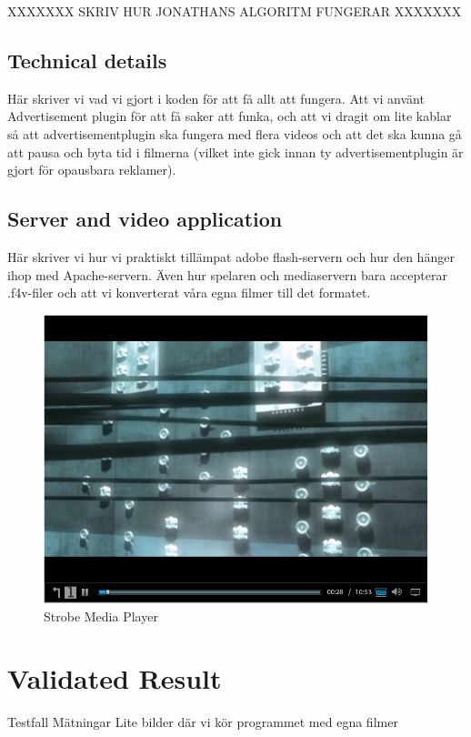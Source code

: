 \documentclass[9pt,a4paper]{acmproc}
\begin{document}
XXXXXXX SKRIV HUR JONATHANS ALGORITM FUNGERAR XXXXXXX

\subsection{Technical details}
Här skriver vi vad vi gjort i koden för att få allt att fungera. Att vi använt Advertisement plugin för att få saker att funka, och att vi dragit om lite kablar så att advertisementplugin ska fungera med flera videos och att det ska kunna gå att pausa och byta tid i filmerna (vilket inte gick innan ty advertisementplugin är gjort för opausbara reklamer).

\subsection{Server and video application}
Här skriver vi hur vi praktiskt tillämpat adobe flash-servern och hur den hänger ihop med Apache-servern.
Även hur spelaren och mediaservern bara accepterar .f4v-filer och att vi konverterat våra egna filmer till det formatet.

\begin{figure}[t!]
\begin{center}
	\includegraphics[scale=0.5]{Media_player.png}
	\caption{Strobe Media Player}
	\label{fig:mediaplayer}
\end{center}
\end{figure}

\section{Validated Result}
Testfall
Mätningar
Lite bilder där vi kör programmet med egna filmer
\end{document}
